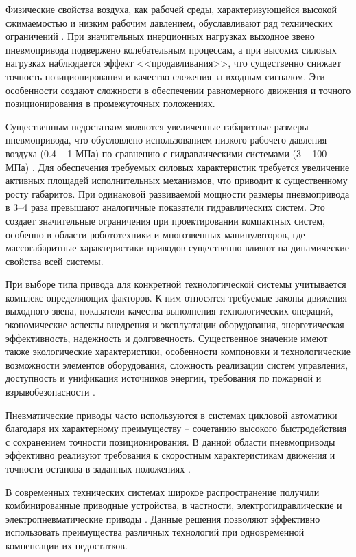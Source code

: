 Физические свойства воздуха, как рабочей среды, характеризующейся высокой
сжимаемостью и низким рабочим давлением, обуславливают ряд технических ограничений \cite{tugengold:a}.
При значительных инерционных нагрузках выходное звено пневмопривода подвержено колебательным процессам, а
при высоких силовых нагрузках наблюдается эффект <<продавливания>>, что существенно снижает точность позиционирования
и качество слежения за входным сигналом. Эти особенности создают сложности в обеспечении равномерного
движения и точного позиционирования в промежуточных положениях.

Существенным недостатком являются увеличенные габаритные размеры пневмопривода, что обусловлено
использованием низкого рабочего давления воздуха (\num{0.4} -- \num{1} МПа) по
сравнению с гидравлическими системами (\num{3} -- \num{100} МПа) \cite{tugengold:a}.
Для обеспечения требуемых силовых характеристик требуется увеличение активных площадей исполнительных
механизмов, что приводит к существенному росту габаритов. При одинаковой развиваемой мощности
размеры пневмопривода в 3--4 раза превышают аналогичные показатели гидравлических
систем. Это создает значительные ограничения при проектировании компактных систем,
особенно в области робототехники и многозвенных манипуляторов, где массогабаритные характеристики приводов существенно влияют на динамические свойства всей системы.

При выборе типа привода для конкретной технологической системы учитывается комплекс определяющих факторов.
К ним относятся требуемые законы движения выходного звена, показатели качества выполнения технологических операций, экономические
аспекты внедрения и эксплуатации оборудования, энергетическая эффективность, надежность и долговечность. Существенное значение имеют
также экологические характеристики, особенности компоновки и технологические возможности элементов оборудования, сложность реализации
систем управления, доступность и унификация источников энергии, требования по пожарной и взрывобезопасности
\cite{zisser2013position,takemura2000hybrid,vladur2016dynamic}.


Пневматические приводы часто используются в системах цикловой
автоматики благодаря их характерному преимуществу -- сочетанию высокого быстродействия
с сохранением точности позиционирования. В данной области
пневмоприводы эффективно реализуют требования к скоростным
характеристикам движения и точности останова в заданных положениях
\cite{hildebrandt2010optimal,carducci2006viscous,salim2015control}.

В современных технических системах широкое распространение получили комбинированные приводные
устройства, в частности, электрогидравлические и электропневматические приводы \cite{рабинович1973системы,трофимов:a}.
Данные решения позволяют эффективно использовать преимущества различных технологий при одновременной компенсации их недостатков.

